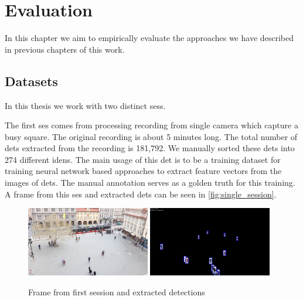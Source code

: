 \chapter{Evaluation}


\label{ch:evaluation}

In this chapter we aim to empirically evaluate the approaches we have described
in previous chapters of this work.

\section{Datasets}

\label{sec:datasets}

In this thesis we work with two distinct \glspl{ses}.

The first \gls{ses} comes from processing recording from single camera which
capture a busy square. The original recording is about 5 minutes long. The total
number of \glspl{det} extracted from the recording is 181,792. We manually sorted
these \glspl{det} into 274 different \glspl{iden}. The main usage of this
\gls{det} is to be a training dataset for training neural network based
approaches to extract feature vectors from the images of \glspl{det}. The
manual annotation serves as a golden truth for this training. A frame from
this \gls{ses} and extracted \glspl{det} can be seen in
\autoref{fig:single_session}.

\begin{figure}
    \centering
    \includegraphics[width=0.48\textwidth]{img/frame_single_session_smaller.png}
    \includegraphics[width=0.48\textwidth]{img/frame_single_session_det_smaller.png}
    \caption{Frame from first session and extracted detections}
    \label{fig:single_session}
\end{figure}


